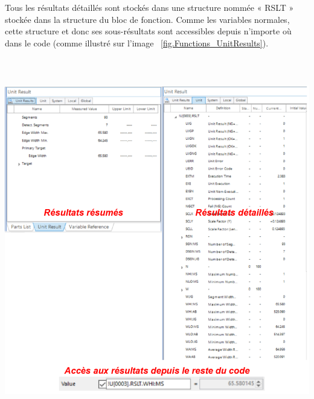 \vspace{0.2cm}
Tous les résultats détaillés sont stockés dans une structure nommée « RSLT » stockée dans la structure du bloc de fonction. Comme les variables normales, cette structure et donc ses sous-résultats sont accessibles depuis n’importe où dans le code (comme illustré sur l’image ~\ref{fig.Functions_UnitResults}).

\noindent
\begin{minipage}[c]{\textwidth}
  \centering
  \includegraphics[width=16cm, height=16cm, keepaspectratio]{addOns/LaboCalib_Functions_AccessResult.png}
  \label{fig.Functions_UnitResults}
\end{minipage}\\
\vspace{0.3cm}



